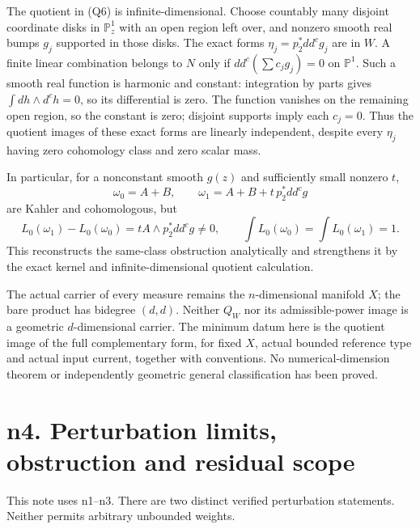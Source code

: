 \documentclass[
  11pt,
]{article}
\begin{document}
The quotient in (Q6) is infinite-dimensional. Choose countably many
disjoint coordinate disks in \(\mathbb P^1_z\) with an open region left
over, and nonzero smooth real bumps \(g_j\) supported in those disks.
The exact forms \(\eta_j=p_2^*dd^cg_j\) are in \(W\). A finite linear
combination belongs to \(N\) only if \(dd^c(\sum c_jg_j)=0\) on
\(\mathbb P^1\). Such a smooth real function is harmonic and constant:
integration by parts gives \(\int dh\wedge d^ch=0\), so its differential
is zero. The function vanishes on the remaining open region, so the
constant is zero; disjoint supports imply each \(c_j=0\). Thus the
quotient images of these exact forms are linearly independent, despite
every \(\eta_j\) having zero cohomology class and zero scalar mass.

In particular, for a nonconstant smooth \(g(z)\) and sufficiently small
nonzero \(t\), \[
\omega_0=A+B,\qquad\omega_1=A+B+t\,p_2^*dd^cg
\] are Kahler and cohomologous, but \[
L_0(\omega_1)-L_0(\omega_0)=tA\wedge p_2^*dd^cg\ne0,
\qquad\int L_0(\omega_0)=\int L_0(\omega_1)=1.
\] This reconstructs the same-class obstruction analytically and
strengthens it by the exact kernel and infinite-dimensional quotient
calculation.

The actual carrier of every measure remains the \(n\)-dimensional
manifold \(X\); the bare product has bidegree \((d,d)\). Neither \(Q_W\)
nor its admissible-power image is a geometric \(d\)-dimensional carrier.
The minimum datum here is the quotient image of the full complementary
form, for fixed \(X\), actual bounded reference type and actual input
current, together with conventions. No numerical-dimension theorem or
independently geometric general classification has been proved.

\section{n4. Perturbation limits, obstruction and residual
scope}\label{n4.-perturbation-limits-obstruction-and-residual-scope}

This note uses n1--n3. There are two distinct verified perturbation
statements. Neither permits arbitrary unbounded weights.
\end{document}

